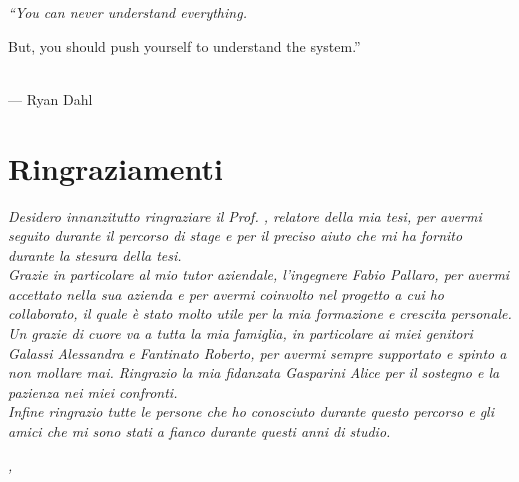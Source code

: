 
\cleardoublepage
{}
{}

\begin{flushright}{
	\slshape    
	``You can never understand everything. 
	
	But, you should push yourself to understand the system.''} \\ 
	\medskip
    --- Ryan Dahl
\end{flushright}


\bigskip

\begingroup
\let\clearpage\relax
\let\cleardoublepage\relax
\let\cleardoublepage\relax

\chapter*{Ringraziamenti}

\noindent \textit{Desidero innanzitutto ringraziare il Prof. \myProf, relatore della mia tesi, per avermi seguito durante il percorso di stage e per il preciso aiuto che mi ha fornito durante la stesura della tesi.} \\

\noindent \textit{Grazie in particolare al mio tutor aziendale, l'ingegnere Fabio Pallaro, per avermi accettato nella sua azienda e per avermi coinvolto nel progetto a cui ho collaborato, il quale è stato molto utile per la mia formazione e crescita personale.} \\

\noindent \textit{Un grazie di cuore va a tutta la mia famiglia, in particolare ai miei genitori Galassi Alessandra e Fantinato Roberto, per avermi sempre supportato e spinto a non mollare mai. Ringrazio la mia fidanzata Gasparini Alice per il sostegno e la pazienza nei miei confronti.}\\

\noindent \textit{Infine ringrazio tutte le persone che ho conosciuto durante questo percorso e gli amici che mi sono stati a fianco durante questi anni di studio.}\\
\bigskip

\noindent\textit{\myLocation, \myTime}
\hfill \myName

\endgroup

